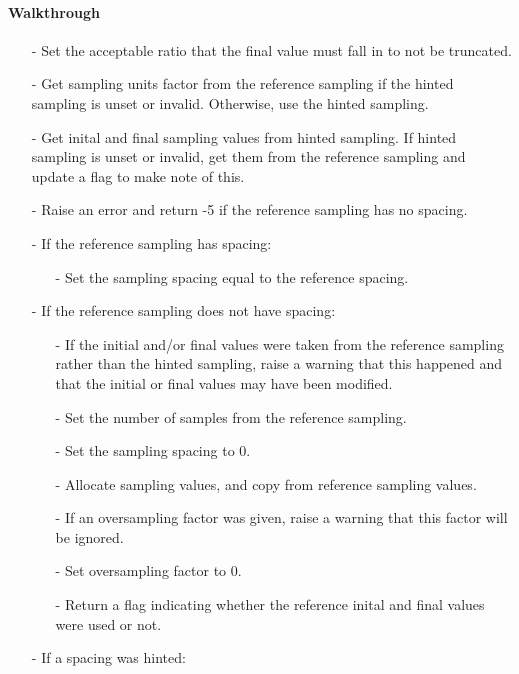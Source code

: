 \documentclass[letterpaper,12pt]{article}
\begin{document}
\paragraph{Walkthrough}
\begin{enumerate}[leftmargin=10pt, noitemsep, parsep=0pt, topsep=0ex]
\item[-] Set the acceptable ratio that the final value must fall in to not be truncated.
\item[-] Get sampling units factor from the reference sampling if the hinted sampling is unset or invalid. Otherwise, use the hinted sampling.
\item[-] Get inital and final sampling values from hinted sampling. If hinted sampling is unset or invalid, get them from the reference sampling and update a flag to make note of this.
\item[-] Raise an error and return -5 if the reference sampling has no spacing.
\item[-] If the reference sampling has spacing:
\begin{enumerate}[leftmargin=10pt, noitemsep, parsep=0pt, topsep=0ex]
\item[-] Set the sampling spacing equal to the reference spacing.
\end{enumerate}
\item[-] If the reference sampling does not have spacing:
\begin{enumerate}[leftmargin=10pt, noitemsep, parsep=0pt, topsep=0ex]
\item[-] If the initial and/or final values were taken from the reference sampling rather than the hinted sampling, raise a warning that this happened and that the initial or final values may have been modified.
\item[-] Set the number of samples from the reference sampling.
\item[-] Set the sampling spacing to 0.
\item[-] Allocate sampling values, and copy from reference sampling values.
\item[-] If an oversampling factor was given, raise a warning that this factor will be ignored.
\item[-] Set oversampling factor to 0.
\item[-] Return a flag indicating whether the reference inital and final values were used or not.
\end{enumerate}
\item[-] If a spacing was hinted:
\begin{enumerate}[leftmargin=10pt, noitemsep, parsep=0pt, topsep=0ex]

\end{enumerate}
\end{enumerate}
\end{document}
